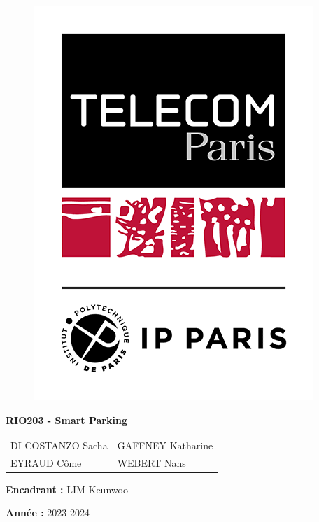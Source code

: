 \begin{titlepage}
\begin{figure}[h]{%
      \includegraphics[height=0.5\textwidth]{Logo.png}
    }
\end{figure}

\vspace*{0.5cm}

{\Huge  \textbf{RIO203 - Smart Parking}}

{\raggedleft\vfill{%

\setlength{\tabcolsep}{12pt}
\begin{tabular}{l l}
        {\Large DI COSTANZO Sacha}  &  {\Large GAFFNEY Katharine} \\
        {\Large EYRAUD Côme}  &  {\Large WEBERT Nans} 
\end{tabular}
\linebreak
\vspace*{1.5cm}




\textbf{{\large Encadrant : }}{\large  LIM Keunwoo}

\vspace*{0.5cm}


\textbf{{\large Année : }}{\large 2023-2024}
\linebreak
}\par}

\end{titlepage}
\restoregeometry
\clearpage

